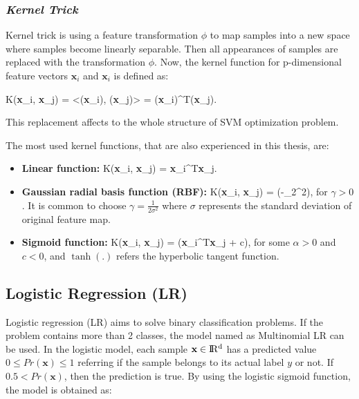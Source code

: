 \subsubsection*{\textit{Kernel Trick}}

Kernel trick is using a feature transformation $\phi$ to map samples into a new space where samples become linearly separable. Then all appearances of samples are replaced with the transformation $\phi$. Now, the kernel function for p-dimensional feature vectors $\textbf{x}_{i}$ and $\textbf{x}_{i}$ is defined as:

\be
\label{eq:kernel_function}
K(\textbf{x}_{i}, \textbf{x}_{j}) = <\phi(\textbf{x}_{i}), \phi(\textbf{x}_{j})> = \phi(\textbf{x}_{i})^{T}\phi(\textbf{x}_{j}).
\ee

This replacement affects to the whole structure of SVM optimization problem.

The most used kernel functions, that are also experienced in this thesis, are:

\begin{itemize}
    \item \textbf{Linear function:}
    \be
    \label{eq:lienar_kernel_function}
    K(\textbf{x}_{i}, \textbf{x}_{j}) = \textbf{x}_{i}^{T}\textbf{x}_{j}.
    \ee
    
    \item \textbf{Gaussian radial basis function (RBF):}
    \be
    \label{eq:rbf_kernel_function}
    K(\textbf{x}_{i}, \textbf{x}_{j}) = \exp(-\gamma {}_{2}^{2})\:,
    \ee
    for $\gamma >0$. It is common to choose $\gamma =\frac{1}{2\sigma ^{2}}$ where $\sigma$ represents the standard deviation of original feature map.
    
    \item \textbf{Sigmoid function:}
    \be
    \label{sigmoid_kernel_function}
    K(\textbf{x}_{i}, \textbf{x}_{j}) = \tanh(\alpha \textbf{x}_{i}^{T}\textbf{x}_{j} + c)\:,
    \ee
    for some $\alpha > 0$ and $c < 0$, and $\tanh(.)$ refers the hyperbolic tangent function.

\end{itemize}



\subsection{Logistic Regression (LR)}
Logistic regression (LR) aims to solve binary classification problems. If the problem contains more than 2 classes, the model named as Multinomial LR can be used.
In the logistic model, each sample $\textbf{x} \in \rm I\!R^{d}$ has a predicted value $ 0 \leq Pr(\textbf{x}) \leq 1$ referring if the sample belongs to its actual label $y$ or not. If $0.5 < Pr(\textbf{x})$, then the prediction is true. By using the logistic sigmoid function, the model is obtained as:

